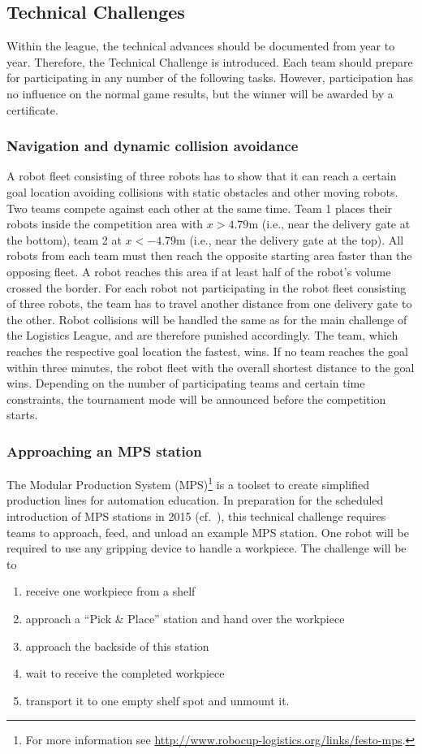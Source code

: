 \documentclass[12pt,twoside]{article}
\begin{document}
\subsection{Technical Challenges}
\label{sec:technical-challenge}
Within the league, the technical advances should be documented from
year to year. Therefore, the Technical Challenge is introduced. Each
team should prepare for participating in any number of the following
tasks. However, participation has no influence on the normal game
results, but the winner will be awarded by a certificate.


\subsubsection{Navigation and dynamic collision avoidance}
A robot fleet consisting of three robots has to show that it can reach
a certain goal location avoiding collisions with static obstacles and
other moving robots. Two teams compete against each other at the same
time. Team 1 places their robots inside the competition area with $x >
4.79$m (i.e., near the delivery gate at the bottom), team 2 at $x <
-4.79$m (i.e., near the delivery gate at the top). All robots from
each team must then reach the opposite starting area faster than the
opposing fleet. A robot reaches this area if at least half of the
robot's volume crossed the border. For each robot not participating in
the robot fleet consisting of three robots, the team has to travel
another distance from one delivery gate to the other. Robot collisions
will be handled the same as for the main challenge of the Logistics
League, and are therefore punished accordingly. The team, which
reaches the respective goal location the fastest, wins. If no team
reaches the goal within three minutes, the robot fleet with the
overall shortest distance to the goal wins. Depending on the number of
participating teams and certain time constraints, the tournament mode
will be announced before the competition starts.

\subsubsection{Approaching an MPS station}
The Modular Production System (MPS)\footnote{For more information see
  \url{http://www.robocup-logistics.org/links/festo-mps}.}  is a
toolset to create simplified production lines for automation
education. In preparation for the scheduled introduction of MPS
stations in 2015 (cf.~\cite{wdrl2013}), this technical challenge
requires teams to approach, feed, and unload an example MPS
station. One robot will be required to use any gripping device to
handle a workpiece. The challenge will be to
\begin{enumerate}
\item receive one workpiece from a shelf
\item approach a ``Pick \& Place'' station and hand over the workpiece
\item approach the backside of this station
\item wait to receive the completed workpiece
\item transport it to one empty shelf spot and unmount it.
\end{enumerate}
\end{document}
